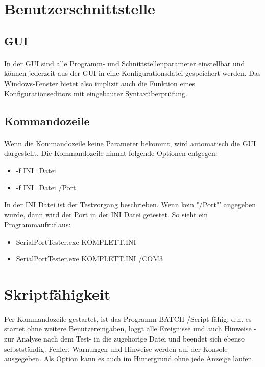 \section{Benutzerschnittstelle}

\subsection{GUI}
\paragraph{}
In der GUI sind alle Programm- und Schnittstellenparameter einstellbar und können jederzeit aus der GUI in eine Konfigurationsdatei gespeichert werden. Das Windows-Fenster bietet also implizit auch die Funktion eines Konfigurationseditors mit eingebauter Syntaxüberprüfung.


\subsection{Kommandozeile}
\paragraph{}
Wenn die Kommandozeile keine Parameter bekommt, wird automatisch die GUI dargestellt. Die Kommandozeile nimmt folgende Optionen entgegen:
\begin{itemize}
\item -f INI\_Datei
\item -f INI\_Datei /Port
\end{itemize} 
In der INI Datei ist der Testvorgang beschrieben. Wenn kein "/Port"' angegeben wurde, dann wird der Port in der INI Datei getestet. So sieht ein Programmaufruf aus:
\begin{itemize}
\item SerialPortTester.exe KOMPLETT.INI
\item SerialPortTester.exe KOMPLETT.INI /COM3 
\end{itemize} 

\section{Skriptfähigkeit}
\paragraph{}
Per Kommandozeile gestartet, ist das Programm BATCH-/Script-fähig, d.h. es startet ohne weitere Benutzereingaben, loggt alle Ereignisse und auch Hinweise -zur Analyse nach dem Test- in die zugehörige Datei und beendet sich ebenso selbstständig. Fehler, Warnungen und Hinweise werden auf der Konsole ausgegeben. Als Option kann es auch im Hintergrund ohne jede Anzeige laufen.


